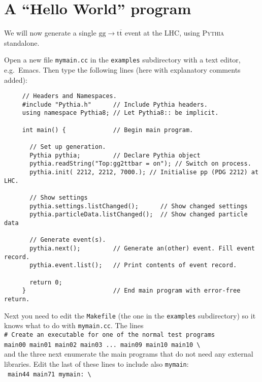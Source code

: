 \documentclass[12pt,a4paper]{article}
\newcommand{\g}{{\mathrm g}}
\renewcommand{\t}{{\mathrm t}}
\newcommand{\tbar}{\overline{\mathrm t}}
\begin{document}
\section{A ``Hello World'' program}

We will now generate a single $\g \g \to \t \tbar$ event at the LHC,
using \textsc{Pythia} standalone.

Open a new file \texttt{mymain.cc} in the \texttt{examples} subdirectory 
with a text editor, e.g.\ Emacs. 
Then type the following lines (here with explanatory comments added):
\begin{verbatim}
     // Headers and Namespaces.
     #include "Pythia.h"      // Include Pythia headers.
     using namespace Pythia8; // Let Pythia8:: be implicit.

     int main() {             // Begin main program.

       // Set up generation.
       Pythia pythia;         // Declare Pythia object
       pythia.readString("Top:gg2ttbar = on"); // Switch on process.
       pythia.init( 2212, 2212, 7000.); // Initialise pp (PDG 2212) at LHC.

       // Show settings
       pythia.settings.listChanged();      // Show changed settings
       pythia.particleData.listChanged();  // Show changed particle data

       // Generate event(s).
       pythia.next();         // Generate an(other) event. Fill event record.
       pythia.event.list();   // Print contents of event record.

       return 0;
     }                        // End main program with error-free return.
\end{verbatim}

Next you need to edit the \texttt{Makefile} (the one in the \texttt{examples} 
subdirectory) so it knows what to do with \texttt{mymain.cc}.
The lines\\
\hspace*{10mm}\texttt{\# Create an executable for one of the normal test 
programs}\\
\hspace*{10mm}\texttt{main00  main01 main02 main03 ... main09 main10 
main10}~\verb+\+ \\
and the three next enumerate the main programs that do not need any 
external libraries. Edit the last of these lines to include also 
\texttt{mymain}:\\
\hspace*{10mm}\texttt{        main44 main71 mymain:}~\verb+\+
\end{document}
